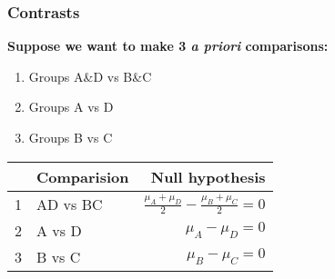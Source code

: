 \documentclass[color=usenames,dvipsnames]{beamer}\usepackage[]{graphicx}\usepackage[]{color}
\begin{document}
\begin{frame}[fragile]
  \frametitle{Contrasts}
  {\bf Suppose we want to make 3 {\it a priori} comparisons:}
  \begin{enumerate}[\bf (1)]
    \item Groups A\&D vs B\&C
    \item Groups A vs D
    \item Groups B vs C
  \end{enumerate}
  \pause
  \vspace{0.5cm}
  \begin{center}
    \begin{tabular}{llr}
      \hline
        & Comparision & Null hypothesis \\
      \hline
      1 & AD vs BC & $\frac{\mu_A + \mu_D}{2} - \frac{\mu_B + \mu_C}{2} = 0$ \\
      2 & A vs D & $\mu_A - \mu_D = 0$ \\
      3 & B vs C & $\mu_B - \mu_C = 0$ \\
      \hline
    \end{tabular}
  \end{center}
\end{frame}
\end{document}
